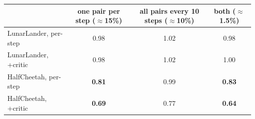 \begin{tabular}{lccc}
\toprule
 & one pair per step ($\approx$15\%) & all pairs every 10 steps ($\approx$10\%) & both ($\approx$1.5\%) \\
\midrule
LunarLander, per-step & 0.98 & 1.02 & 0.98 \\
LunarLander, +critic & 0.98 & 1.02 & 1.00 \\
HalfCheetah, per-step & \textbf{0.81} & 0.99 & \textbf{0.83} \\
HalfCheetah, +critic & \textbf{0.69} & 0.77 & \textbf{0.64} \\
\bottomrule
\end{tabular}
